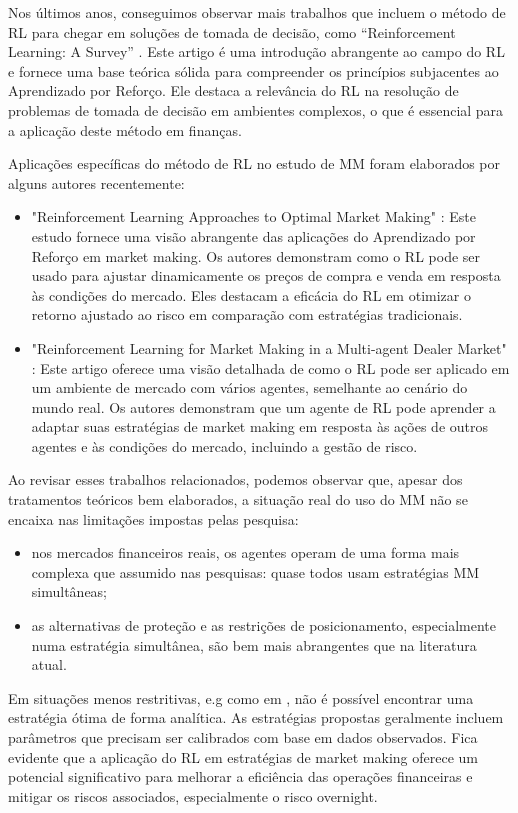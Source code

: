 Nos últimos anos, conseguimos observar mais trabalhos que incluem o método de RL para chegar em soluções de tomada de decisão, como ``Reinforcement Learning: A Survey'' \citep{Kaelbling1996}. Este artigo é uma introdução abrangente ao campo do RL e fornece uma base teórica sólida para compreender os princípios subjacentes ao Aprendizado por Reforço. Ele destaca a relevância do RL na resolução de problemas de tomada de decisão em ambientes complexos, o que é essencial para a aplicação deste método em finanças.

Aplicações específicas do método de RL no estudo de MM foram elaborados por alguns autores recentemente:
\begin{itemize}
    \item "Reinforcement Learning Approaches to Optimal Market Making" \citep{Gasperov2021}: Este estudo fornece uma visão abrangente das aplicações do Aprendizado por Reforço em market making. Os autores demonstram como o RL pode ser usado para ajustar dinamicamente os preços de compra e venda em resposta às condições do mercado. Eles destacam a eficácia do RL em otimizar o retorno ajustado ao risco em comparação com estratégias tradicionais.
    \item "Reinforcement Learning for Market Making in a Multi-agent Dealer Market" \citep{Ganesh2019}: Este artigo oferece uma visão detalhada de como o RL pode ser aplicado em um ambiente de mercado com vários agentes, semelhante ao cenário do mundo real. Os autores demonstram que um agente de RL pode aprender a adaptar suas estratégias de market making em resposta às ações de outros agentes e às condições do mercado, incluindo a gestão de risco.
\end{itemize}


Ao revisar esses trabalhos relacionados, podemos observar que, apesar dos tratamentos teóricos bem elaborados, a situação real do uso do MM não se encaixa nas limitações impostas pelas pesquisa:

\begin{itemize}
    \item nos mercados financeiros reais, os agentes operam de uma forma mais complexa que assumido nas pesquisas: quase todos usam estratégias MM simultâneas;
    \item as alternativas de proteção e as restrições de posicionamento, especialmente numa estratégia simultânea, são bem mais abrangentes que na literatura atual. 
\end{itemize}

Em situações menos restritivas, e.g como em \citet{Avellaneda2008}, não é possível encontrar uma estratégia ótima de forma analítica. As estratégias propostas geralmente incluem parâmetros que precisam ser calibrados com base em dados observados.
Fica evidente que a aplicação do RL em estratégias de market making oferece um potencial significativo para melhorar a eficiência das operações financeiras e mitigar os riscos associados, especialmente o risco overnight. 

